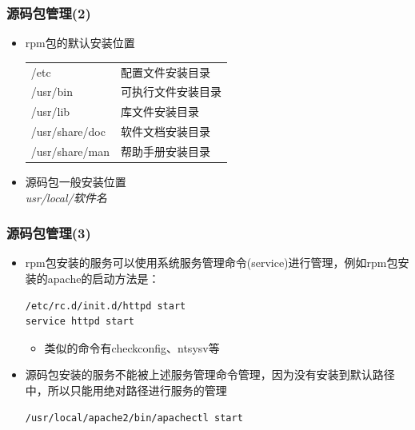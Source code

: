 \documentclass[xcolor=svgnames,presentation]{beamer}
\begin{document}
\begin{frame}
\frametitle{源码包管理(2)}
\label{sec-3-14}
\begin{itemize}

\item rpm包的默认安装位置\\
\label{sec-3-14-1}%
\begin{center}
\begin{tabular}{ll}
 /etc            &  配置文件安装目录    \\
 /usr/bin        &  可执行文件安装目录  \\
 /usr/lib        &  库文件安装目录      \\
 /usr/share/doc  &  软件文档安装目录    \\
 /usr/share/man  &  帮助手册安装目录    \\
\end{tabular}
\end{center}



\item 源码包一般安装位置\\
\label{sec-3-14-2}%
\emph{usr/local/软件名}
\end{itemize} %
\end{frame}
\begin{frame}[fragile]
\frametitle{源码包管理(3)}
\label{sec-3-15}
\begin{itemize}

\item rpm包安装的服务可以使用系统服务管理命令(service)进行管理，例如rpm包安装的apache的启动方法是：\\
\label{sec-3-15-1}%
\begin{verbatim}
/etc/rc.d/init.d/httpd start
service httpd start
\end{verbatim}
\begin{itemize}

\item 类似的命令有checkconfig、ntsysv等
\label{sec-3-15-1-1}%
\end{itemize} %

\item 源码包安装的服务不能被上述服务管理命令管理，因为没有安装到默认路径中，所以只能用绝对路径进行服务的管理\\
\label{sec-3-15-2}%
\begin{verbatim}
/usr/local/apache2/bin/apachectl start
\end{verbatim}
\end{itemize} %
\end{frame}
\end{document}

